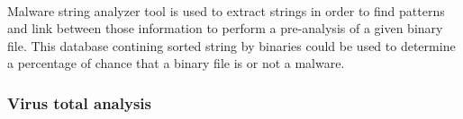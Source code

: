 \paragraph{}


Malware string analyzer tool is used to extract strings in order to find patterns and link 
between those information to perform a pre-analysis of a given binary file. This database
contining sorted string by binaries could be used to determine a percentage of chance that
a binary file is or not a malware.




\subsubsection{Virus total analysis} %

\paragraph{}

